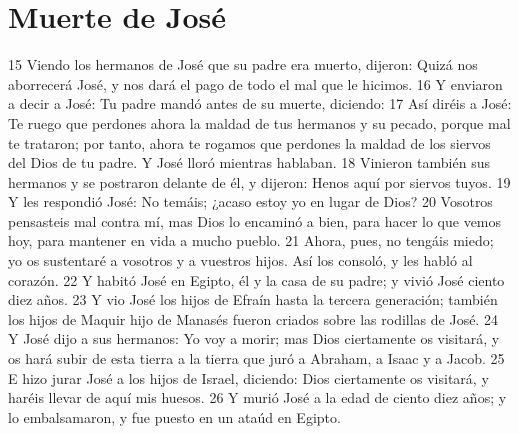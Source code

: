 \section*{Muerte de José}

15 Viendo los hermanos de José que su padre era muerto, dijeron: Quizá nos aborrecerá José, y nos dará el pago de todo el mal que le hicimos.
16 Y enviaron a decir a José: Tu padre mandó antes de su muerte, diciendo:
17 Así diréis a José: Te ruego que perdones ahora la maldad de tus hermanos y su pecado, porque mal te trataron; por tanto, ahora te rogamos que perdones la maldad de los siervos del Dios de tu padre. Y José lloró mientras hablaban.
18 Vinieron también sus hermanos y se postraron delante de él, y dijeron: Henos aquí por siervos tuyos.
19 Y les respondió José: No temáis; ¿acaso estoy yo en lugar de Dios?
20 Vosotros pensasteis mal contra mí, mas Dios lo encaminó a bien, para hacer lo que vemos hoy, para mantener en vida a mucho pueblo.
21 Ahora, pues, no tengáis miedo; yo os sustentaré a vosotros y a vuestros hijos. Así los consoló, y les habló al corazón.
22 Y habitó José en Egipto, él y la casa de su padre; y vivió José ciento diez años.
23 Y vio José los hijos de Efraín hasta la tercera generación; también los hijos de Maquir hijo de Manasés fueron criados sobre las rodillas de José.
24 Y José dijo a sus hermanos: Yo voy a morir; mas Dios ciertamente os visitará, y os hará subir de esta tierra a la tierra que juró a Abraham, a Isaac y a Jacob.
25 E hizo jurar José a los hijos de Israel, diciendo: Dios ciertamente os visitará, y haréis llevar de aquí mis huesos.
26 Y murió José a la edad de ciento diez años; y lo embalsamaron, y fue puesto en un ataúd en Egipto.



